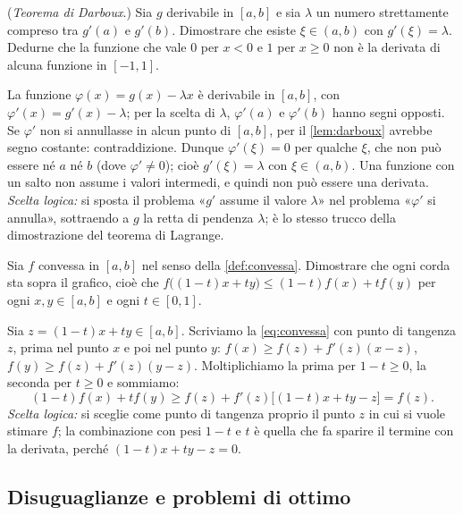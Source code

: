 \begin{esercizio}\label{es:darboux}
(\emph{Teorema di Darboux}.) Sia $g$ derivabile in $[a,b]$ e sia $\lambda$ un numero
strettamente compreso tra $g'(a)$ e $g'(b)$. Dimostrare che esiste $\xi\in(a,b)$ con
$g'(\xi)=\lambda$. Dedurne che la funzione che vale $0$ per $x<0$ e $1$ per $x\ge0$ non è
la derivata di alcuna funzione in $[-1,1]$.
\begin{soluzione}
La funzione $\varphi(x)=g(x)-\lambda x$ è derivabile in $[a,b]$, con
$\varphi'(x)=g'(x)-\lambda$; per la scelta di $\lambda$, $\varphi'(a)$ e $\varphi'(b)$ hanno
segni opposti. Se $\varphi'$ non si annullasse in alcun punto di $[a,b]$, per il
\cref{lem:darboux} avrebbe segno costante: contraddizione. Dunque $\varphi'(\xi)=0$ per
qualche $\xi$, che non può essere né $a$ né $b$ (dove $\varphi'\neq0$); cioè
$g'(\xi)=\lambda$ con $\xi\in(a,b)$. Una funzione con un salto non assume i valori
intermedi, e quindi non può essere una derivata. \emph{Scelta logica:} si sposta il
problema «$g'$ assume il valore $\lambda$» nel problema «$\varphi'$ si annulla»,
sottraendo a $g$ la retta di pendenza $\lambda$; è lo stesso trucco della dimostrazione
del teorema di Lagrange.
\end{soluzione}
\end{esercizio}

\begin{esercizio}\label{es:corde-convesse}
Sia $f$ convessa in $[a,b]$ nel senso della \cref{def:convessa}. Dimostrare che ogni
corda sta sopra il grafico, cioè che
$f\bigl((1-t)x+ty\bigr)\le(1-t)f(x)+tf(y)$ per ogni $x,y\in[a,b]$ e ogni $t\in[0,1]$.
\begin{soluzione}
Sia $z=(1-t)x+ty\in[a,b]$. Scriviamo la \eqref{eq:convessa} con punto di tangenza $z$,
prima nel punto $x$ e poi nel punto $y$:
$f(x)\ge f(z)+f'(z)(x-z)$, $f(y)\ge f(z)+f'(z)(y-z)$. Moltiplichiamo la prima per
$1-t\ge0$, la seconda per $t\ge0$ e sommiamo:
\[
  (1-t)f(x)+tf(y)\ge f(z)+f'(z)\bigl[(1-t)x+ty-z\bigr]=f(z) .
\]
\emph{Scelta logica:} si sceglie come punto di tangenza proprio il punto $z$ in cui si
vuole stimare $f$; la combinazione con pesi $1-t$ e $t$ è quella che fa sparire il termine
con la derivata, perché $(1-t)x+ty-z=0$.
\end{soluzione}
\end{esercizio}

\subsection*{Disuguaglianze e problemi di ottimo}

